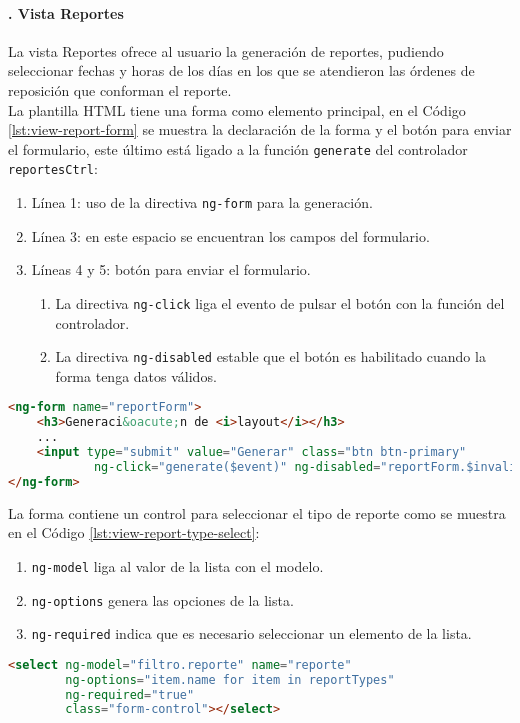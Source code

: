 \paragraph{. Vista Reportes\\}
La vista Reportes ofrece al usuario la generación de reportes, pudiendo seleccionar fechas y horas de los días en los que se atendieron las órdenes de reposición que conforman el reporte.\\
La plantilla HTML tiene una forma como elemento principal, en el Código \ref{lst:view-report-form} se muestra la declaración de la forma y el botón para enviar el formulario, este último está ligado a la función \texttt{generate} del controlador \texttt{reportesCtrl}:

\begin{enumerate}
	\item Línea 1: uso de la directiva \texttt{ng-form} para la generación.
	\item Línea 3: en este espacio se encuentran los campos del formulario.
	\item Líneas 4 y 5: botón para enviar el formulario.
	\begin{enumerate}
		\item La directiva \texttt{ng-click} liga el evento de pulsar el botón con la función del controlador.
		\item La directiva \texttt{ng-disabled} estable que el botón es habilitado cuando la forma tenga datos válidos.
	\end{enumerate}
\end{enumerate}

\begin{lstlisting}[language=HTML, captionpos=b, caption={Forma de generación de reportes}, label={lst:view-report-form}]
<ng-form name="reportForm">
	<h3>Generaci&oacute;n de <i>layout</i></h3>
	...
	<input type="submit" value="Generar" class="btn btn-primary"
			ng-click="generate($event)" ng-disabled="reportForm.$invalid"/>	
</ng-form>
\end{lstlisting}

La forma contiene un control para seleccionar el tipo de reporte como se muestra en el Código \ref{lst:view-report-type-select}:
\begin{enumerate}
	\item \texttt{ng-model} liga al valor de la lista con el modelo.
	\item \texttt{ng-options} genera las opciones de la lista.
	\item \texttt{ng-required} indica que es necesario seleccionar un elemento de la lista.
\end{enumerate}
\begin{lstlisting}[language=HTML, captionpos=b, caption={Lista para seleccionar el tipo de reporte.}, label={lst:view-report-type-select}]
<select ng-model="filtro.reporte" name="reporte"
		ng-options="item.name for item in reportTypes"
		ng-required="true"
		class="form-control"></select>
\end{lstlisting}

